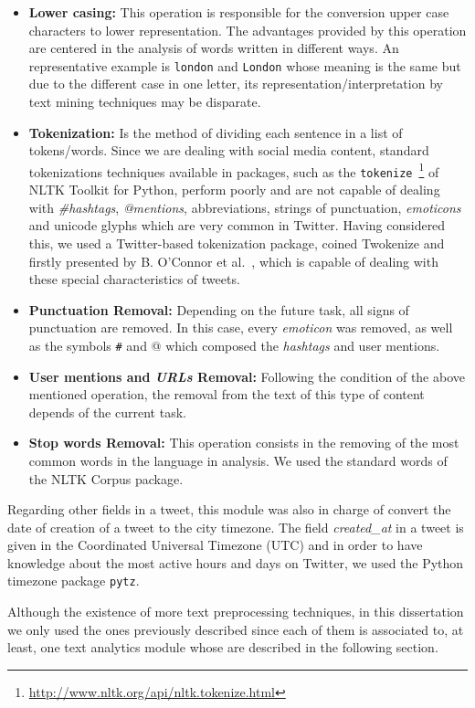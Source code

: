 \begin{itemize}
	\item \textbf{Lower casing:} This operation is responsible for the conversion upper case characters to lower representation. The advantages provided by this operation are centered in the analysis of words written in different ways. An representative example is \texttt{london} and \texttt{London} whose meaning is the same but due to the different case in one letter, its representation/interpretation by text mining techniques may be disparate.
	\item \textbf{Tokenization:} Is the method of dividing each sentence in a list of tokens/words. Since we are dealing with social media content, standard tokenizations techniques available in packages, such as the \texttt{tokenize}~\footnote{\url{http://www.nltk.org/api/nltk.tokenize.html}} of NLTK Toolkit for Python, perform poorly and are not capable of dealing with \textit{\#hashtags}, \textit{@mentions}, abbreviations, strings of punctuation, \textit{emoticons} and unicode glyphs which are very common in Twitter. Having considered this, we used a Twitter-based tokenization package, coined Twokenize and firstly presented by B. O'Connor et al.~\cite{o2010tweetmotif}, which is capable of dealing with these special characteristics of tweets.
	\item \textbf{Punctuation Removal:} Depending on the future task, all signs of punctuation are removed. In this case, every \textit{emoticon} was removed, as well as the symbols \texttt{\#} and {@} which composed the \textit{hashtags} and user mentions.
	\item \textbf{User mentions and \textit{URLs} Removal:} Following the condition of the above mentioned operation, the removal from the text of this type of content depends of the current task.
	\item \textbf{Stop words Removal:} This operation consists in the removing of the most common words in the language in analysis. We used the standard words of the NLTK Corpus package.
\end{itemize}

Regarding other fields in a tweet, this module was also in charge of convert the date of creation of a tweet to the city timezone. The field \textit{created\_at} in a tweet is given in the Coordinated Universal Timezone (UTC) and in order to have knowledge about the most active hours and days on Twitter, we used the Python timezone package \texttt{pytz}.

Although the existence of more text preprocessing techniques, in this dissertation we only used the ones previously described since each of them is associated to, at least, one text analytics module whose are described in the following section.

